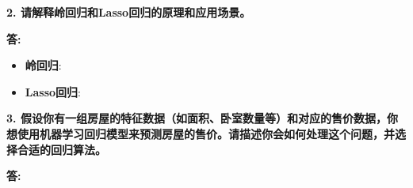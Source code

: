 \documentclass{article}
\begin{document}
\begin{homeworkProblem}
	\textbf{2. 请解释岭回归和Lasso回归的原理和应用场景。}\\
{\color{blue}\textbf{答:}
\begin{itemize}
\item{\textbf{岭回归}:}
\item{\textbf{Lasso回归}:}
\end{itemize}

}	
\end{homeworkProblem}


\begin{homeworkProblem}
	\textbf{3. 假设你有一组房屋的特征数据（如面积、卧室数量等）和对应的售价数据，你想使用机器学习回归模型来预测房屋的售价。请描述你会如何处理这个问题，并选择合适的回归算法。}\\
{\color{blue}\textbf{答:}


}	
\end{homeworkProblem}




%
\end{document}

